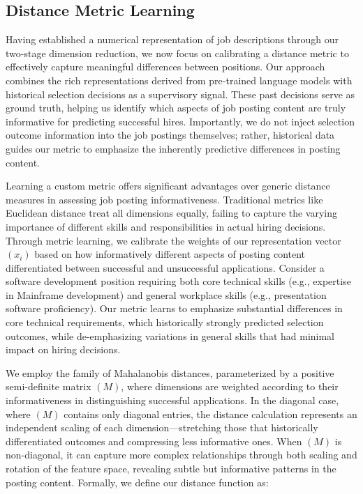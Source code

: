 \subsection{Distance Metric Learning}

Having established a numerical representation of job descriptions through our two-stage dimension reduction, 
we now focus on calibrating a distance metric to effectively capture meaningful differences between positions. 
Our approach combines the rich representations derived from pre-trained language models with historical selection 
decisions as a supervisory signal. These past decisions serve as ground truth, helping us identify which aspects 
of job posting content are truly informative for predicting successful hires. Importantly, we do not inject 
selection outcome information into the job postings themselves; rather, historical data guides our metric 
to emphasize the inherently predictive differences in posting content.

Learning a custom metric offers significant advantages over generic distance measures in assessing job posting 
informativeness. Traditional metrics like Euclidean distance treat all dimensions equally, failing to capture 
the varying importance of different skills and responsibilities in actual hiring decisions. Through metric 
learning, we calibrate the weights of our representation vector $(x_i)$ based on how informatively different 
aspects of posting content differentiated between successful and unsuccessful applications. Consider a 
software development position requiring both core technical skills (e.g., expertise in Mainframe development) 
and general workplace skills (e.g., presentation software proficiency). Our metric learns to emphasize 
substantial differences in core technical requirements, which historically strongly predicted selection outcomes, 
while de-emphasizing variations in general skills that had minimal impact on hiring decisions.

We employ the family of Mahalanobis distances, parameterized by a positive semi-definite matrix $(M)$, where 
dimensions are weighted according to their informativeness in distinguishing successful applications. In the 
diagonal case, where $(M)$ contains only diagonal entries, the distance calculation represents an independent 
scaling of each dimension---stretching those that historically differentiated outcomes and compressing less 
informative ones. When $(M)$ is non-diagonal, it can capture more complex relationships through both scaling 
and rotation of the feature space, revealing subtle but informative patterns in the posting content. Formally, 
we define our distance function as:

